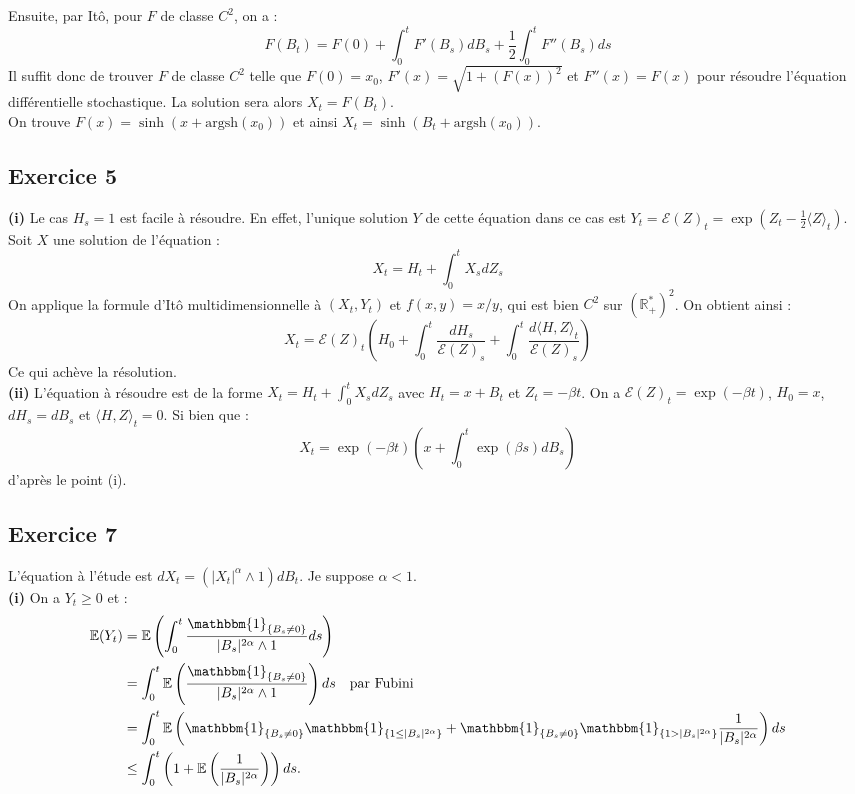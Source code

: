 \documentclass[a4paper,12pt]{article}
\newcommand{\E}{\mathbb{E}}
\newcommand{\ind}{\mathbbm{1}}
\newcommand{\sme}{\mathcal{E}}
\begin{document}
Ensuite, par Itô, pour $F$ de classe $C^2$, on a :
$$F(B_t)=F(0)+\int_0^t F'(B_s) dB_s + \frac{1}{2} \int_0^t F''(B_s) ds$$
Il suffit donc de trouver $F$ de classe $C^2$ telle que $F(0)=x_0$, $F'(x)=\sqrt{1+(F(x))^2}$ et $F''(x)=F(x)$ pour résoudre l'équation différentielle stochastique. La solution sera alors $X_t=F(B_t)$. \\

On trouve $F(x)=\sinh (x+ \text{argsh}(x_0))$ et ainsi $X_t = \sinh (B_t + \text{argsh}(x_0))$.

\subsection{Exercice 5} 
\textbf{(i)} Le cas $H_s=1$ est facile à résoudre. En effet, l'unique solution $Y$ de cette équation dans ce cas est $Y_t = \sme (Z)_t = \exp{(Z_t - \frac{1}{2} \langle Z \rangle_t)}$. 
Soit $X$ une solution de l'équation : 
$$X_t = H_t + \int_0^t X_s dZ_s$$
On applique la formule d'Itô multidimensionnelle à $(X_t, Y_t)$ et $f(x,y) = x/y$, qui est bien $C^2$ sur $\left(\mathbb{R}^*_+ \right)^2$. On obtient ainsi :
$$X_t=\sme (Z)_t \left( H_0 + \int_0^t \frac{dH_s}{\sme(Z)_s} + \int_0^t \frac{d \langle H,Z \rangle_t}{\sme (Z)_s} \right)$$
Ce qui achève la résolution. \\

\textbf{(ii)} L'équation à résoudre est de la forme $X_t=H_t+\int_0^t X_s dZ_s$ avec $H_t=x+B_t$ et $Z_t= -\beta t$. On a $\sme(Z)_t= \exp{(-\beta t)}$, $H_0=x$, $dH_s=dB_s$ et $\langle H, Z \rangle_t=0$. Si bien que :
$$X_t = \exp{(- \beta t)} \left( x + \int_0^t \exp{(\beta s)} dB_s \right)$$
d'après le point (i).

\subsection{Exercice 7} 

L'équation à l'étude est $dX_t = (|X_t|^{\alpha} \wedge 1)dB_t$. Je suppose $\alpha < 1$. \\

\textbf{(i)} On a $Y_t \geq 0$ et :
\begin{align*}
\E (Y_t) &= \E \left( \int_0^t \frac{\ind_{\{B_s \neq 0\}}}{|B_s|^{2 \alpha} \wedge 1} ds \right) \\
&= \int_0^t \E \left( \frac{\ind_{\{ B_s \neq 0 \}}}{|B_s|^{2 \alpha} \wedge 1} \right) ds \quad \text{par Fubini} \\
&= \int_0^t \E \left( \ind_{\{B_s \neq 0 \}} \ind_{\{1 \leq |B_s|^{2 \alpha} \}} + \ind_{\{B_s \neq 0 \}} \ind_{\{1 > |B_s|^{2 \alpha} \}} \frac{1}{|B_s|^{2 \alpha}} \right) ds \\
&\leq \int_0^t \left( 1 + \E \left( \frac{1}{|B_s|^{2 \alpha}} \right) \right) ds.
\end{align*}
\end{document}
